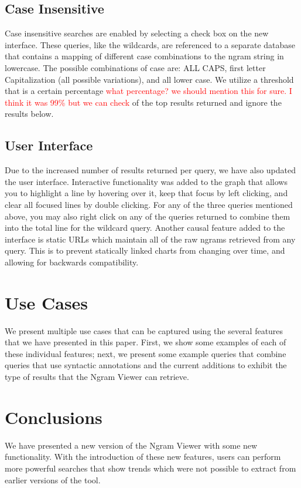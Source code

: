 \documentclass[11pt]{article}
\begin{document}
\subsection{Case Insensitive}
Case insensitive searches are enabled by selecting a check box on the new interface. These queries, like the wildcards, are referenced to a separate database that contains a mapping of different case combinations to the ngram string in lowercase. The possible combinations of case are: ALL CAPS, first letter Capitalization (all possible variations), and all lower case. We utilize a threshold that is a certain percentage \textcolor{red}{what percentage? we should mention this for sure. I think it was 99\% but we can check} of the top results returned and ignore the results below.



\subsection{User Interface}
\label{sec:userint}
Due to the increased number of results returned per query, we have also updated the user interface. Interactive functionality was added to the graph that allows you to highlight a line by hovering over it, keep that focus by left clicking, and clear all focused lines by double clicking. For any of the three queries mentioned above, you may also right click on any of the queries returned to combine them into the total line for the wildcard query. Another causal feature added to the interface is static URLs which maintain all of the raw ngrams retrieved from any query. This is to prevent statically linked charts from changing over time, and allowing for backwards compatibility.


\section{Use Cases}
\label{sec:usecases}
We present multiple use cases that can be captured using the several features that we have presented in this paper. First, we show some examples of each of these individual features; next, we present some example queries that combine queries that use syntactic annotations and the current additions to exhibit the type of results that the Ngram Viewer can retrieve.


\section{Conclusions}
We have presented a new version of the Ngram Viewer with some new functionality. With the introduction of these new features, users can perform more powerful searches that show trends which were not possible to extract from earlier versions of the tool. 
\end{document}
